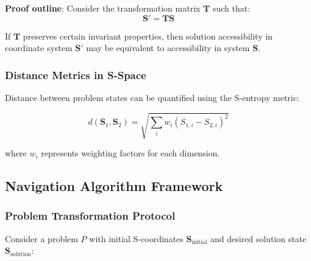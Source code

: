 \documentclass[11pt]{article}
\begin{document}
\textbf{Proof outline}: Consider the transformation matrix $\mathbf{T}$ such that:
\begin{equation}
\mathbf{S}' = \mathbf{T} \mathbf{S}
\label{eq:coordinate_transformation}
\end{equation}

If $\mathbf{T}$ preserves certain invariant properties, then solution accessibility in coordinate system $\mathbf{S}'$ may be equivalent to accessibility in system $\mathbf{S}$.

\subsubsection{Distance Metrics in S-Space}

Distance between problem states can be quantified using the S-entropy metric:

\begin{equation}
d(\mathbf{S}_1, \mathbf{S}_2) = \sqrt{\sum_{i} w_i (S_{1,i} - S_{2,i})^2}
\label{eq:s_entropy_distance}
\end{equation}

where $w_i$ represents weighting factors for each dimension.

\subsection{Navigation Algorithm Framework}

\subsubsection{Problem Transformation Protocol}

Consider a problem $P$ with initial S-coordinates $\mathbf{S}_{\text{initial}}$ and desired solution state $\mathbf{S}_{\text{solution}}$:
\end{document}
